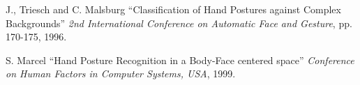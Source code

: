 J., Triesch and C. Malsburg
``Classification of Hand Postures against Complex Backgrounds''
{\em 2nd International Conference on Automatic Face and Gesture}, pp. 170-175, 1996.

S. Marcel
``Hand Posture Recognition in a Body-Face centered space''
{\em Conference on Human Factors in Computer Systems, USA}, 1999.

